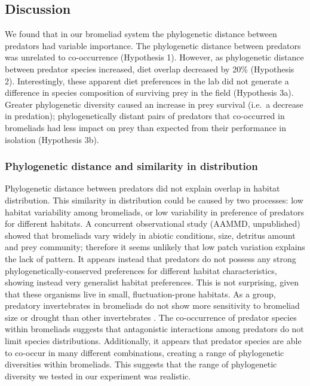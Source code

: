 \subsection{Discussion}\label{discussion}

We found that in our bromeliad system the phylogenetic distance between
predators had variable importance. The phylogenetic distance between
predators was unrelated to co-occurrence (Hypothesis 1). However, as
phylogenetic distance between predator species increased, diet overlap
decreased by 20\% (Hypothesis 2). Interestingly, these apparent diet
preferences in the lab did not generate a difference in species
composition of surviving prey in the field (Hypothesis 3a). Greater
phylogenetic diversity caused an increase in prey survival (i.e.~a
decrease in predation); phylogenetically distant pairs of predators that
co-occurred in bromeliads had less impact on prey than expected from
their performance in isolation (Hypothesis 3b).

\subsubsection{Phylogenetic distance and similarity in
distribution}\label{phylogenetic-distance-and-similarity-in-distribution}

Phylogenetic distance between predators did not explain overlap in
habitat distribution. This similarity in distribution could be caused by
two processes: low habitat variability among bromeliads, or low
variability in preference of predators for different habitats. A
concurrent observational study (AAMMD, unpublished) showed that
bromeliads vary widely in abiotic conditions, size, detritus amount and
prey community; therefore it seems unlikely that low patch variation
explains the lack of pattern. It appears instead that predators do not
possess any strong phylogenetically-conserved preferences for different
habitat characteristics, showing instead very generalist habitat
preferences. This is not surprising, given that these organisms live in
small, fluctuation-prone habitats. As a group, predatory invertebrates
in bromeliads do not show more sensitivity to bromeliad size or drought
than other invertebrates \citep{Amundrud2015}. The co-occurrence of
predator species within bromeliads suggests that antagonistic
interactions among predators do not limit species distributions.
Additionally, it appears that predator species are able to co-occur in
many different combinations, creating a range of phylogenetic
diversities within bromeliads. This suggests that the range of
phylogenetic diversity we tested in our experiment was realistic.

